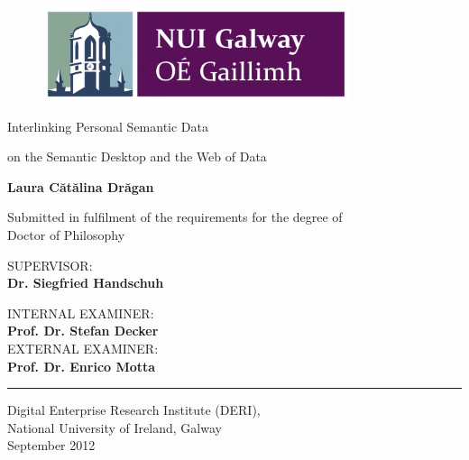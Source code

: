 \thispagestyle{empty}

\begin{figure}
\centering
  \includegraphics[width=0.8\textwidth]{frontmatter/img/nuig_logo.jpg}
\end{figure}

\vspace*{0.5cm}

\begin{center}
{\huge Interlinking Personal Semantic Data\par} 
{\Large on the Semantic Desktop and the Web of Data\par}
\vspace*{1cm}
\end{center}

\begin{center}
\textbf{Laura C\u{a}t\u{a}lina Dr\u{a}gan}
\end{center}

\begin{center}
\vspace{2cm}

{\normalsize Submitted in fulfilment of the requirements for the degree of\\
Doctor of Philosophy\\ \par}

\vspace{2cm}

SUPERVISOR:\\
\textbf{Dr. Siegfried Handschuh}\\

\vspace{0.5cm}

\begin{multicols}{2}
\begin{center}
INTERNAL EXAMINER:\\
\textbf{Prof. Dr. Stefan Decker}\\
\vspace{5cm}
EXTERNAL EXAMINER:\\
\textbf{Prof. Dr. Enrico Motta}\\
\end{center}
\end{multicols}

\vspace{1cm} \hrule \vspace{0.4cm} Digital Enterprise Research Institute (DERI),\\ National University of Ireland, Galway\\
September 2012
\end{center}
